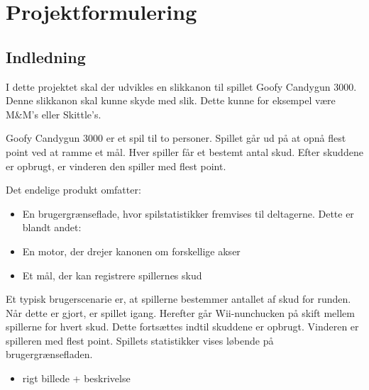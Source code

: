 \frontmatter
\maketitle
\AddToShipoutPicture*{\BackgroundPic}
\clearpage
\newpage

\tableofcontents

\newpage
\listoffigures
\newpage

\mainmatter


\chapter{Projektformulering}
\section{Indledning}
I dette projektet skal der udvikles en slikkanon til spillet Goofy Candygun 3000. Denne slikkanon skal kunne skyde med slik. Dette kunne for eksempel være M\&M’s eller Skittle’s.

Goofy Candygun 3000 er et spil til to personer. Spillet går ud på at opnå flest point ved at ramme et mål. Hver spiller får et bestemt antal skud. Efter skuddene er opbrugt, er vinderen den spiller med flest point.


Det endelige produkt omfatter:
\begin{itemize}
	\item{En brugergrænseflade, hvor spilstatistikker fremvises til deltagerne. Dette er blandt andet:}
	\item{En motor, der drejer kanonen om forskellige akser}
	\item{Et mål, der kan registrere spillernes skud}
\end{itemize}

Et typisk brugerscenarie er, at spillerne bestemmer antallet af skud for runden. Når dette er gjort, er spillet igang. Herefter går Wii-nunchucken på skift mellem spillerne for hvert skud. Dette fortsættes indtil skuddene er opbrugt. Vinderen er spilleren med flest point. Spillets statistikker vises løbende på brugergrænsefladen. 

\begin{itemize}
	\item{rigt billede + beskrivelse}
\end{itemize}


